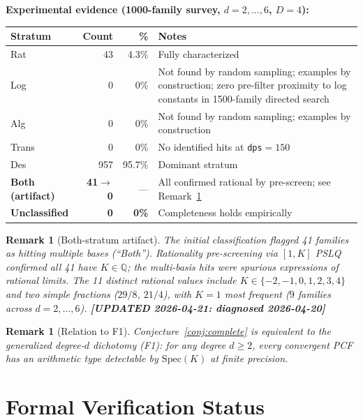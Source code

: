 \documentclass[12pt]{amsart}
\newcommand{\UPDATED}[1]{{\color{teal}\textbf{[UPDATED 2026-04-21: #1]}}}
\newtheorem{remark}[theorem]{Remark}
\begin{document}
\noindent\textbf{Experimental evidence
(1000-family survey, $d=2,\ldots,6$,
$D=4$):}

\begin{center}
\begin{tabular}{lrrp{5cm}}
\hline
Stratum & Count & \% & Notes \\
\hline
Rat & 43 & 4.3\% &
  Fully characterized \cite{Rat} \\
Log & 0 & 0\% &
  Not found by random sampling;
  examples by construction;
  zero pre-filter proximity to log
  constants in 1500-family directed
  search \cite{Log} \\
Alg & 0 & 0\% &
  Not found by random sampling;
  examples by construction \cite{Alg,Spectral} \\
Trans & 0 & 0\% &
  No identified hits at \texttt{dps}$=150$ \\
Des & 957 & 95.7\% &
  Dominant stratum \cite{Desert,Khinchin} \\
\textbf{Both (artifact)} & \textbf{41$\to$0} & — &
  All confirmed rational by pre-screen;
  see Remark~\ref{rem:rat-contamination} \\
\textbf{Unclassified} & \textbf{0} & \textbf{0\%} &
  Completeness holds empirically \\
\hline
\end{tabular}
\end{center}

\begin{remark}[Both-stratum artifact]
\label{rem:rat-contamination}
The initial classification flagged 41 families
as hitting multiple bases (``Both''). Rationality
pre-screening via $[1,K]$ PSLQ confirmed all
41 have $K\in\mathbb{Q}$; the multi-basis hits
were spurious expressions of rational limits.
The 11 distinct rational values include
$K\in\{-2,-1,0,1,2,3,4\}$ and two simple
fractions ($29/8$, $21/4$), with $K=1$ most
frequent ($9$ families across $d=2,\ldots,6$).
\UPDATED{diagnosed 2026-04-20}
\end{remark}

\begin{remark}[Relation to F1]
Conjecture~\ref{conj:complete} is equivalent
to the \emph{generalized degree-$d$ dichotomy}
(F1): for any degree $d\geq 2$, every
convergent PCF has an arithmetic type
detectable by $\mathrm{Spec}(K)$ at finite
precision.
\end{remark}

\section{Formal Verification Status}
\label{sec:lean}
\end{document}
